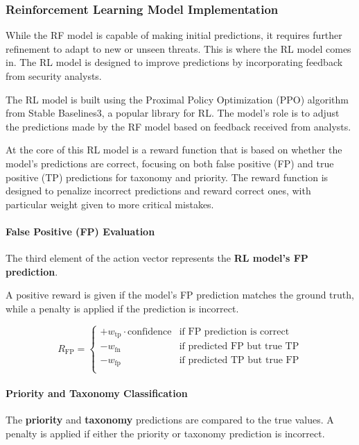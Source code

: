 \subsubsection{Reinforcement Learning Model Implementation}

While the RF model is capable of making initial predictions, it requires further refinement to adapt to new or unseen threats. 
This is where the RL model comes in. The RL model is designed to improve predictions by incorporating feedback from security analysts.

The RL model is built using the Proximal Policy Optimization (PPO) algorithm from Stable Baselines3, a popular library for RL. 
The model's role is to adjust the predictions made by the RF model based on feedback received from analysts. 

At the core of this RL model is a reward function that is based on whether the model's predictions are correct, focusing on both false positive (FP) and true positive (TP) predictions for taxonomy and priority. 
The reward function is designed to penalize incorrect predictions and reward correct ones, with particular weight given to more critical mistakes.

\paragraph{False Positive (FP) Evaluation}
The third element of the action vector represents the \textbf{RL model's FP prediction}. 

A positive reward is given if the model's FP prediction matches the ground truth, while a penalty is applied if the prediction is incorrect.

\[
R_{\text{FP}} = 
\begin{cases} 
+ w_{\text{tp}} \cdot \text{confidence} & \text{if FP prediction is correct} \\
- w_{\text{fn}} & \text{if predicted FP but true TP} \\
- w_{\text{fp}} & \text{if predicted TP but true FP} \\
\end{cases}
\label{eq:fp_reward}
\]

\paragraph{Priority and Taxonomy Classification}
The \textbf{priority} and \textbf{taxonomy} predictions are compared to the true values. A penalty is applied if either the priority or taxonomy prediction is incorrect.

